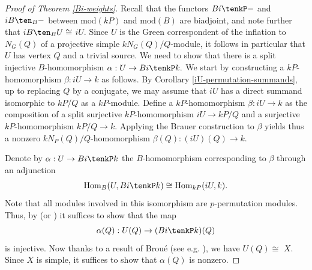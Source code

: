 \documentclass{amsart}
\theoremstyle{plain}\newtheorem{Theorem}{Theorem}[section]
\theoremstyle{plain}\newtheorem{Conjecture}[Theorem]{Conjecture}
\theoremstyle{plain}\newtheorem{Corollary}[Theorem]{Corollary}
\theoremstyle{plain}\newtheorem{Lemma}[Theorem]{Lemma}
\theoremstyle{plain}\newtheorem{Proposition}[Theorem]{Proposition}
\theoremstyle{definition}\newtheorem{Definition}[Theorem]{Definition}
\theoremstyle{definition}\newtheorem{Example}[Theorem]{Example}
\theoremstyle{definition}\newtheorem{Examples}[Theorem]{Examples}
\theoremstyle{definition}\newtheorem{Exercise}[Theorem]{Exercise}
\theoremstyle{definition}\newtheorem{Notation}[Theorem]{Notation}
\theoremstyle{definition}\newtheorem{Remark}[Theorem]{Remark}
\theoremstyle{definition}\newtheorem{Remarks}[Theorem]{Remarks}
\theoremstyle{plain}\newtheorem{Statement}[Theorem]{}
\def\Hom{\mathrm{Hom}}           \def\tenkS{\otimes_{kS}}
\def\mod{\mathrm{mod}}
\begin{document}
\begin{proof}[Proof of Theorem \ref{Bi-weights}]
Recall  that  the functors $Bi\tenkP -$ and $iB \ten_B -$ between 
$\mod(kP)$ and $\mod(B)$ are biadjoint, and note further that
$iB\ten_B U\cong$ $iU$.   Since $U$ is the Green correspondent of the
inflation to $N_G(Q)$ of a projective simple $kN_G(Q)/Q$-module, it follows
in particular that $U$ has vertex $Q$ and a trivial source. 
We need to show that there is a split injective $B$-homomorphism
$ \alpha :U \to Bi\tenkP k.$
We start by constructing a
$kP$-homomorphism  $\beta : iU\to k$ as follows.
By Corollary  \ref{iU-permutation-summands}, up to replacing $Q$ by a conjugate,
we may assume that $iU$ has a direct summand isomorphic to $kP/Q$ as
a $kP$-module. Define a $kP$-homomorphism $\beta : iU \to k$ as the
composition of a split surjective $kP$-homomorphism $iU\to kP/Q$
and a surjective $kP$-homomorphism $kP/Q\to k$. Applying the Brauer
construction to $\beta$ yields thus a nonzero $kN_P(Q)/Q$-homomorphism
$\beta(Q) : (iU)(Q)\to k$.

Denote by $\alpha : U \to Bi \tenkP k$ the $B$-homomorphism corresponding
to $\beta$ through an adjunction
$$\Hom_B(U, Bi\tenkP k)\cong \Hom_{kP}(iU, k).$$ 
 Note that all modules involved in this isomorphism are $p$-permutation modules.
Thus, by \cite[Proposition A.1]{Li-endo} (or \cite[Proposition 5.10.7]{LiBookI})
it suffices to show that the map
$$\alpha(Q) : U(Q) \to (Bi\tenkP k)(Q)$$
is injective. Now thanks to a result of Brou\'e \cite[(3.4)]{Broue85} 
(see e.g. \cite[Theorem 5.10.5]{LiBookI}), we have $U(Q)\cong$ $X$.
Since $X$ is simple, it suffices to show that $\alpha(Q)$ is nonzero. 


\end{proof}
\end{document}
